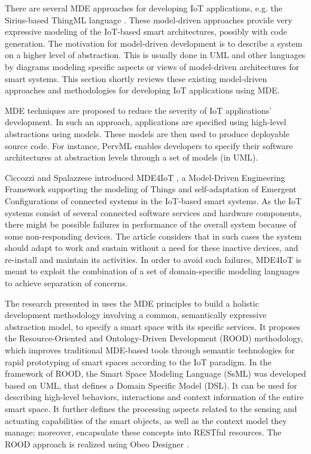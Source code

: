 There are several MDE approaches for developing IoT applications, e.g. the Sirius-based ThingML language \cite{Fleurey+2011}. These model-driven approaches provide very expressive modeling of the IoT-based smart architectures, possibly with code generation. The motivation for model-driven development is to describe a system on a higher level of abstraction. This is usually done in UML and other languages by diagrams modeling specific aspects or views of model-driven architectures for smart systems. This section shortly reviews these existing model-driven approaches and methodologies for developing IoT applications using MDE.

MDE techniques are proposed to reduce the severity of IoT applications' development. In such an approach, applications are specified using high-level abstractions using models. These models are then used to produce deployable source code. For instance, PervML \cite{serral2010towards} enables developers to specify their software architectures at abstraction levels through a set of models (in UML).

Ciccozzi and Spalazzese introduced MDE4IoT \cite{ciccozzi2016mde4iot}, a Model-Driven Engineering Framework supporting the modeling of Things and self-adaptation of Emergent Configurations of connected systems in the IoT-based smart systems. As the IoT systems consist of several connected software services and hardware components, there might be possible failures in performance of the overall system because of some non-responding devices. The article considers that in such cases the system should adapt to work and sustain without a need for these inactive devices, and re-install and maintain its activities. In order to avoid such failures, MDE4IoT is meant to exploit the combination of a set of domain-specific modeling languages to achieve separation of concerns.

The research presented in \cite{Corredor+2012} uses the MDE principles to build a holistic development methodology involving a common, semantically expressive abstraction model, to specify a smart space with its specific services. It proposes the Resource-Oriented and Ontology-Driven Development (ROOD) methodology, which improves traditional MDE-based tools through semantic technologies for rapid prototyping of smart spaces according to the IoT paradigm. In the framework of ROOD, the Smart Space Modeling Language (SsML) was developed based on UML, that defines a Domain Specific Model (DSL). It can be used for describing high-level behaviors, interactions and context information of the entire smart space. It further defines the processing aspects related to the sensing and actuating capabilities of the smart objects, as well as the context model they manage; moreover, encapsulate these concepts into RESTful resources. The ROOD approach is realized using Obeo Designer \cite{Designer2016}.

